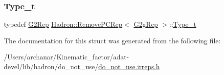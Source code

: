 \mbox{\label{structHadron_1_1RemovePCRep_3_01G2gRep_01_4_a941bc08fab6e6b89fb5316cdcc77cd49}} 
\subsubsection{\texorpdfstring{Type\_t}{Type\_t}\hspace{0.1cm}{\footnotesize\ttfamily [2/2]}}
{\footnotesize\ttfamily typedef \mbox{\hyperlink{structHadron_1_1G2Rep}{G2\+Rep}} \mbox{\hyperlink{structHadron_1_1RemovePCRep}{Hadron\+::\+Remove\+P\+C\+Rep}}$<$ \mbox{\hyperlink{structHadron_1_1G2gRep}{G2g\+Rep}} $>$\+::\mbox{\hyperlink{structHadron_1_1RemovePCRep_3_01G2gRep_01_4_a941bc08fab6e6b89fb5316cdcc77cd49}{Type\+\_\+t}}}



The documentation for this struct was generated from the following file\+:\begin{DoxyCompactItemize}
\item 
/\+Users/archanar/\+Kinematic\+\_\+factor/adat-\/devel/lib/hadron/do\+\_\+not\+\_\+use/\mbox{\hyperlink{adat-devel_2lib_2hadron_2do__not__use_2do__not__use_8irreps_8h}{do\+\_\+not\+\_\+use.\+irreps.\+h}}\end{DoxyCompactItemize}
